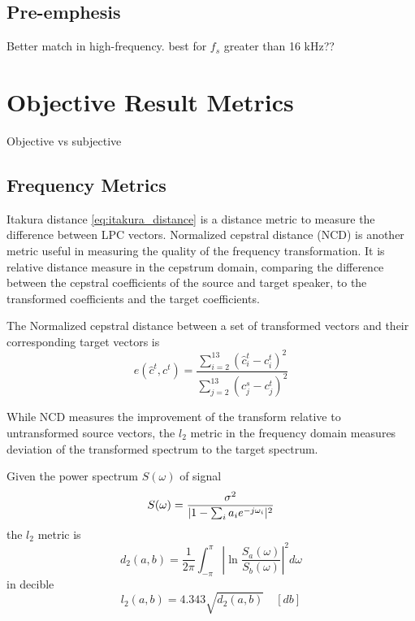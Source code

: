\subsection{Pre-emphesis} %
\label{sub:pre_emphesis}
Better match in high-frequency. best for $f_s$ greater than 16 kHz??

\section{Objective Result Metrics} %
\label{sec:objective_metrics}
Objective vs subjective

\subsection{Frequency Metrics} %
\label{sub:frequency_metrics}
Itakura distance \eqref{eq:itakura_distance} is a distance metric to measure the difference between LPC vectors. Normalized cepstral distance (NCD) is another metric useful in measuring the quality of the frequency transformation. It is relative distance measure in the cepstrum domain, comparing the difference between the cepstral coefficients of the source and target speaker, to the transformed coefficients and the target coefficients.
\begin{definition}
	The Normalized cepstral distance between a set of transformed vectors and their corresponding target vectors is
	\begin{equation}
		e(\hat{c}^t,c^t) = \frac{{\sum}_{i=2}^{13}(\hat{c}_{i}^t-c_{i}^t)^2}{\sum_{j=2}^{13}(c_{j}^s-c_{j}^t)^2}
	\end{equation}
\end{definition}

While NCD measures the improvement of the transform relative to untransformed source vectors, the $l_2$ metric in the frequency domain measures deviation of the transformed spectrum to the target spectrum.
\begin{definition}
	Given the power spectrum $S(\omega)$ of signal
\begin{equation}
	S(\omega) = \frac{\sigma^2}{\lvert1-\sum_{i}a_i e^{-j\omega_i}\rvert^2}
\end{equation}
the $l_2$ metric is \cite{gray76} 
\begin{equation}
	d_2(a,b) = \frac{1}{2\pi}\int_{-\pi}^{\pi}\left\lvert\ln \frac{S_a(\omega)}{S_b(\omega)}\right\rvert^2 d\omega
\end{equation}
in decible 
\begin{equation}
	l_2(a,b)  = 4.343 \sqrt{d_2(a,b)} \quad [db]
\end{equation}
\end{definition}

